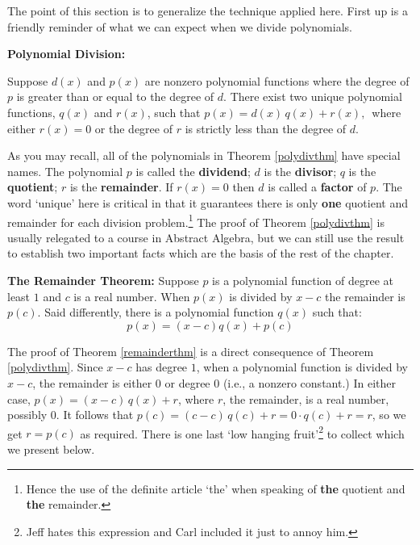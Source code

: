 The point of this section is to generalize the technique applied here.  First up is a friendly reminder of what we can expect when we divide polynomials.

\smallskip

\colorbox{ResultColor}{\bbm

\begin{thm} \label{polydivthm} \textbf{Polynomial Division:} 

Suppose $d(x)$ and $p(x)$ are nonzero polynomial functions where the degree of $p$ is greater than or equal to the degree of $d$.  There exist two unique polynomial functions, $q(x)$ and $r(x)$, such that $p(x) = d(x) \, q(x) + r(x),\,$ where either $r(x) = 0$ or the degree of $r$ is strictly less than the degree of $d$.
\end{thm}
\ebm}

\medskip

As you may recall, all of the polynomials in Theorem \ref{polydivthm} have special names.  The polynomial $p$ is called the  \textbf{dividend}; $d$ is the  \textbf{divisor}; $q$ is the  \textbf{quotient}; $r$ is the  \textbf{remainder}.  If $r(x)=0$ then $d$ is called a  \textbf{factor} of $p$.  The word `unique' here is critical in that it guarantees there is only \textbf{one} quotient and remainder for each division problem.\footnote{Hence the use of the definite article `the' when speaking of \textbf{the} quotient and \textbf{the} remainder.} The proof of Theorem \ref{polydivthm} is usually relegated to a course in Abstract Algebra, but we can still use the result to establish two important facts which are the basis of the rest of the chapter.

\medskip

\colorbox{ResultColor}{\bbm

\begin{thm} \label{remainderthm}\textbf{The Remainder Theorem:}  
Suppose $p$ is a polynomial function of degree at least $1$ and $c$ is a real number.  When $p(x)$ is divided by $x-c$ the remainder is $p(c)$.  Said differently, there is a polynomial  function $q(x)$ such that:  \[ p(x) = (x-c) q(x) + p(c)\]

\end{thm}
\ebm}

\medskip


The proof of Theorem \ref{remainderthm} is a direct consequence of Theorem \ref{polydivthm}.  Since  $x-c$ has degree $1$, when a polynomial function is divided by $x-c$, the remainder is either $0$ or degree $0$ (i.e., a nonzero constant.)   In either case, $p(x) = (x-c) \, q(x) + r$, where $r$, the remainder, is a real number, possibly $0$.  It follows that $p(c) = (c-c) \, q(c) + r = 0 \cdot q(c) + r = r$, so we get $r = p(c)$ as required.  There is one last `low hanging fruit'\footnote{Jeff hates this expression and Carl included it just to annoy him.} to collect which we present below.

